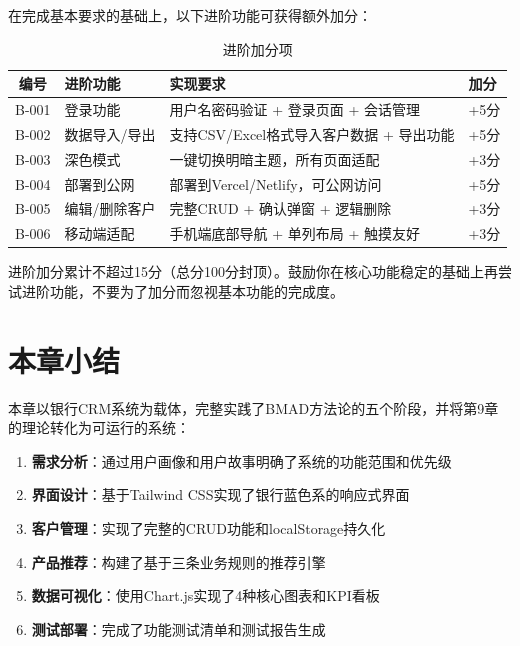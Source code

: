 在完成基本要求的基础上，以下进阶功能可获得额外加分：

\begin{table}[H]
\centering
\begin{tabular}{clp{6cm}l}
\toprule
\textbf{编号} & \textbf{进阶功能} & \textbf{实现要求} & \textbf{加分} \\
\midrule
B-001 & 登录功能 & 用户名密码验证 + 登录页面 + 会话管理 & +5分 \\
B-002 & 数据导入/导出 & 支持CSV/Excel格式导入客户数据 + 导出功能 & +5分 \\
B-003 & 深色模式 & 一键切换明暗主题，所有页面适配 & +3分 \\
B-004 & 部署到公网 & 部署到Vercel/Netlify，可公网访问 & +5分 \\
B-005 & 编辑/删除客户 & 完整CRUD + 确认弹窗 + 逻辑删除 & +3分 \\
B-006 & 移动端适配 & 手机端底部导航 + 单列布局 + 触摸友好 & +3分 \\
\bottomrule
\end{tabular}
\caption{进阶加分项}
\end{table}

\begin{notebox}[进阶加分上限]
进阶加分累计不超过15分（总分100分封顶）。鼓励你在核心功能稳定的基础上再尝试进阶功能，不要为了加分而忽视基本功能的完成度。
\end{notebox}

\section{本章小结}

本章以银行CRM系统为载体，完整实践了BMAD方法论的五个阶段，并将第9章的理论转化为可运行的系统：

\begin{enumerate}[leftmargin=2em]
  \item \textbf{需求分析}：通过用户画像和用户故事明确了系统的功能范围和优先级
  \item \textbf{界面设计}：基于Tailwind CSS实现了银行蓝色系的响应式界面
  \item \textbf{客户管理}：实现了完整的CRUD功能和localStorage持久化
  \item \textbf{产品推荐}：构建了基于三条业务规则的推荐引擎
  \item \textbf{数据可视化}：使用Chart.js实现了4种核心图表和KPI看板
  \item \textbf{测试部署}：完成了功能测试清单和测试报告生成
\end{enumerate}


